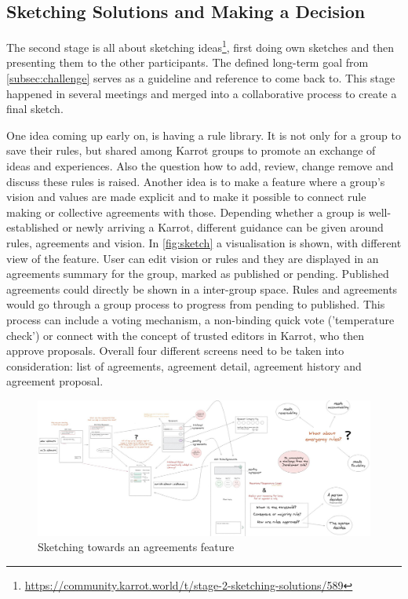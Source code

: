 \documentclass[
	a4paper,%
	11pt,%
	]{article}
\begin{document}
\subsection{Sketching Solutions and Making a Decision}

The second stage is all about sketching ideas\footnote{\label{url:2sketching}\url{https://community.karrot.world/t/stage-2-sketching-solutions/589}}, first doing own sketches and then presenting them to the other participants. The defined long-term goal from \autoref{subsec:challenge} serves as a guideline and reference to come back to. This stage happened in several meetings and merged into a collaborative process to create a final sketch.

One idea coming up early on, is having a rule library. It is not only for a group to save their rules, but shared among Karrot groups to promote an exchange of ideas and experiences. Also the question how to add, review, change remove and discuss these rules is raised. Another idea is to make a feature where a group's vision and values are made explicit and to make it possible to connect rule making or collective agreements with those. Depending whether a group is well-established or newly arriving a Karrot, different guidance can be given around rules, agreements and vision. In \autoref{fig:sketch} a visualisation is shown, with different view of the feature. User can edit vision or rules and they are displayed in an agreements summary for the group, marked as published or pending. Published agreements could directly be shown in a inter-group space. Rules and agreements would go through a group process to progress from pending to published. This process can include a voting mechanism, a non-binding quick vote ('temperature check') or connect with the concept of trusted editors in Karrot, who then approve proposals. Overall four different screens need to be taken into consideration: list of agreements, agreement detail, agreement history and agreement proposal.
    

\begin{figure}[ht]
	\includegraphics[width=\textwidth
	]{images/sketch.jpg}
	\caption{Sketching towards an agreements feature}
	\label{fig:sketch}
\end{figure}
\end{document}
